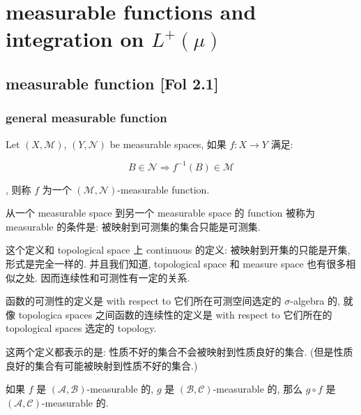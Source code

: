 \chapter{\texorpdfstring{measurable functions and integration on \(L^{+}(\mu)\)}{measurable functions and integration on L\^{}\{+\}(\textbackslash mu)}}\label{measurable-functions-and-integration-on-lmu}

\section{measurable function {[}Fol 2.1{]}}

\subsection{general measurable function}\label{general-measurable-function}

\begin{definition}{}

Let  \((X,\mathcal{M})\), \((Y,\mathcal{N})\) be measurable spaces, 如果 \(f:X\rightarrow Y\) 满足:

\[B \in \mathcal{N}\Longrightarrow f^{- 1}(B) \in \mathcal{M}\]

, 则称 \(f\) 为一个 \((\mathcal{M},\mathcal{N})\)-measurable function.

\end{definition}

从一个 measurable space 到另一个 measurable space 的 function 被称为 measurable 的条件是: 被映射到可测集的集合只能是可测集.

这个定义和 topological space 上 continuous 的定义: 被映射到开集的只能是开集, 形式是完全一样的. 并且我们知道, topological space 和 measure space 也有很多相似之处. 因而连续性和可测性有一定的关系.

函数的可测性的定义是 with respect to 它们所在可测空间选定的 \(\sigma\)-algebra 的, 就像 topologica spaces 之间函数的连续性的定义是 with respect to 它们所在的 topological spaces 选定的 topology.

这两个定义都表示的是: 性质不好的集合不会被映射到性质良好的集合. (但是性质良好的集合有可能被映射到性质不好的集合.)

\begin{proposition}{}

如果 \(f\) 是 \((\mathcal{A},\mathcal{B})\)-measurable 的, \(g\) 是 \((\mathcal{B},\mathcal{C})\)-measurable 的, 那么 \(g \circ f\) 是 \((\mathcal{A},\mathcal{C})\)-measurable 的.

\end{proposition}

